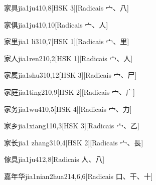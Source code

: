 \begin{entry}{家具}{jia1ju4}{10,8}[HSK 3][Radicais ⼧、⼋]
\end{entry}

\begin{entry}{家俱}{jia1ju4}{10,10}[Radicais ⼧、⼈]
\end{entry}

\begin{entry}{家里}{jia1 li3}{10,7}[HSK 1][Radicais ⼧、⾥]
\end{entry}

\begin{entry}{家人}{jia1ren2}{10,2}[HSK 1][Radicais ⼧、⼈]
\end{entry}

\begin{entry}{家属}{jia1shu3}{10,12}[HSK 3][Radicais ⼧、⼫]
\end{entry}

\begin{entry}{家庭}{jia1ting2}{10,9}[HSK 2][Radicais ⼧、⼴]
\end{entry}

\begin{entry}{家务}{jia1wu4}{10,5}[HSK 4][Radicais ⼧、⼒]
\end{entry}

\begin{entry}{家乡}{jia1xiang1}{10,3}[HSK 3][Radicais ⼧、⼄]
\end{entry}

\begin{entry}{家长}{jia1 zhang3}{10,4}[HSK 2][Radicais ⼧、⾧]
\end{entry}

\begin{entry}{傢具}{jia1ju4}{12,8}[Radicais ⼈、⼋]
\end{entry}

\begin{entry}{嘉年华}{jia1nian2hua2}{14,6,6}[Radicais ⼝、⼲、⼗]
\end{entry}

